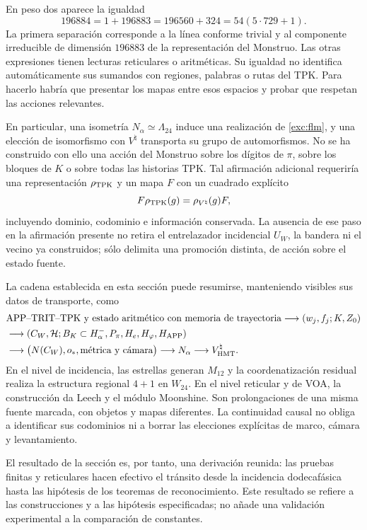 En peso dos aparece la igualdad
\[
 196884=1+196883=196560+324=54(5\cdot729+1).
\]
La primera separación corresponde a la línea conforme trivial y al
componente irreducible de dimensión $196883$ de la representación
del Monstruo. Las otras expresiones tienen lecturas reticulares o
aritméticas. Su igualdad no identifica automáticamente sus sumandos
con regiones, palabras o rutas del TPK. Para hacerlo habría que
presentar los mapas entre esos espacios y probar que respetan las
acciones relevantes.


En particular, una isometría $N_\alpha\simeq\Lambda_{24}$ induce
una realización de \eqref{exc:flm}, y una elección de isomorfismo
con $V^\natural$ transporta su grupo de automorfismos. No se ha
construido con ello una acción del Monstruo sobre los dígitos de
$\pi$, sobre los bloques de $K$ o sobre todas las historias TPK.
Tal afirmación adicional requeriría una representación
$\rho_{\rm TPK}$ y un mapa $F$ con un cuadrado explícito
\[
 F\rho_{\rm TPK}(g)=\rho_{V^\natural}(g)F,
\]
incluyendo dominio, codominio e información conservada. La ausencia
de ese paso en la afirmación presente no retira el entrelazador
incidencial $U_W$, la bandera ni el vecino ya construidos; sólo
delimita una promoción distinta, de acción sobre el estado fuente.

La cadena establecida en esta sección puede resumirse, manteniendo
visibles sus datos de transporte, como
\begin{align*}
 &\text{APP--TRIT--TPK y estado aritmético con memoria de trayectoria}
   \longrightarrow (w_j,f_j;K,Z_0)\\
 &\longrightarrow (C_W,\mathcal H;B_K\subset H^-_\alpha,
                   P_\pi,H_e,H_\varphi,H_{\rm APP})\\
 &\longrightarrow \bigl(N(C_W),o_*,\text{métrica y cámara}\bigr)
   \longrightarrow N_\alpha
   \longrightarrow V^\natural_{\rm HMT}.
\end{align*}
En el nivel de incidencia, las estrellas generan $M_{12}$ y la
coordenatización residual realiza la estructura regional $4+1$ en $W_{24}$.
En el nivel reticular y de VOA, la construcción da Leech y el módulo
Moonshine. Son prolongaciones de una misma fuente marcada, con
objetos y mapas diferentes. La continuidad causal no obliga a
identificar sus codominios ni a borrar las elecciones explícitas
de marco, cámara y levantamiento.

El resultado de la sección es, por tanto, una derivación reunida:
las pruebas finitas y reticulares hacen efectivo el tránsito desde
la incidencia dodecafásica hasta las hipótesis de los teoremas de
reconocimiento. Este resultado se refiere a las construcciones y
a las hipótesis especificadas; no añade una validación experimental
a la comparación de constantes.
